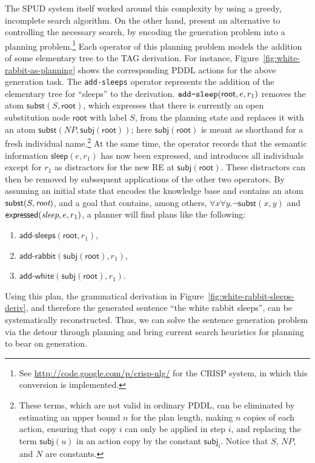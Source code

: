 The SPUD system itself worked around this complexity by using a
greedy, incomplete search algorithm. On the other hand,
\citet{KolSto07} present an alternative to controlling the necessary
search, by encoding the generation problem into a planning
problem.\footnote{See \url{http://code.google.com/p/crisp-nlg/} for
  the CRISP system, in which this conversion is implemented.} Each
operator of this planning problem models the addition of some
elementary tree to the TAG derivation. For instance,
Figure~\ref{fig:white-rabbit-as-planning} shows the corresponding PDDL
actions for the above generation task. The \texttt{add-sleeps}
operator represents the addition of the elementary tree for ``sleeps''
to the derivation. $\verb?add-sleep?(\mathsf{root},e,r_1)$ removes the
atom $\mathsf{subst}(S,\mathsf{root})$, which expresses that there is
currently an open substitution node $\mathsf{root}$ with label $S$,
from the planning state and replaces it with an atom
$\mathsf{subst}(NP,\mathsf{subj}(\mathsf{root}))$; here
$\mathsf{subj}(\mathsf{root})$ is meant as shorthand for a fresh
individual name.\footnote{These terms, which are not valid in ordinary
  PDDL, can be eliminated by estimating an upper bound $n$ for the
  plan length, making $n$ copies of each action, ensuring that copy
  $i$ can only be applied in step $i$, and replacing the term
  $\mathsf{subj}(u)$ in an action copy by the constant
  $\mathsf{subj}_i$. Notice that $S$, $NP$, and $N$ are constants.}
At the same time, the operator records that the semantic information
$\mathsf{sleep}(e,r_1)$ has now been expressed, and introduces all
individuals except for $r_1$ as distractors for the new RE at
$\mathsf{subj}(\mathsf{root})$. These distractors can then be removed
by subsequent applications of the other two operators. By assuming an
initial state that encodes the knowledge base and contains an atom
$\mathsf{subst}(S,\emph{root})$, and a goal that contains, among
others, $\forall x \forall y. \neg \mathsf{subst}(x,y)$ and
$\mathsf{expressed}(\emph{sleep},e,r_1)$, a planner will find plans
like the following:
%
\begin{enumerate}
\item $\mathsf{add}\textsf{-}\mathsf{sleeps}(\mathsf{root}, r_1)$,
\item $\mathsf{add}\textsf{-}\mathsf{rabbit}(\mathsf{subj}(\mathsf{root}),r_1)$,
\item $\mathsf{add}\textsf{-}\mathsf{white}(\mathsf{subj}(\mathsf{root}),r_1)$.
\end{enumerate}
%
Using this plan, the grammatical derivation in
Figure~\ref{fig:white-rabbit-sleeps-deriv}, and therefore the
generated sentence ``the white rabbit sleeps'', can be systematically
reconstructed. Thus, we can solve the sentence generation problem via
the detour through planning and bring current search heuristics for
planning to bear on generation.


